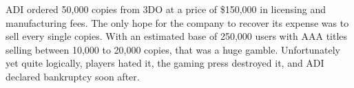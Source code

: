 \par
ADI ordered 50,000 copies from 3DO at a price of \$150,000 in licensing and manufacturing fees. The only hope for the company to recover its expense was to sell every single copies. With an estimated base of 250,000 users with AAA titles selling between 10,000 to 20,000 copies, that was a huge gamble. Unfortunately yet quite logically, players hated it, the gaming press destroyed it, and ADI declared bankruptcy soon after. \\
\par
{}\\
\par
\vspace{20pt}




